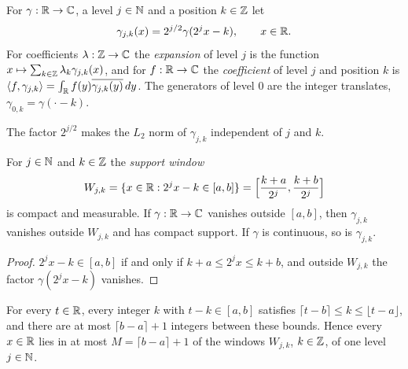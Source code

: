 \begin{definition}
\label{def:daub-generators}
\leanok
For $\gamma : \mathbb{R} \to \mathbb{C}$, a level $j \in \mathbb{N}$ and a position $k \in \mathbb{Z}$ let
\[
  \gamma_{j,k}(x) = 2^{j/2} \gamma(2^j x - k) , \qquad x \in \mathbb{R} .
\]
For coefficients $\lambda : \mathbb{Z} \to \mathbb{C}$ the \emph{expansion} of level $j$ is the function
$x \mapsto \sum_{k \in \mathbb{Z}} \lambda_k \gamma_{j,k}(x)$, and for $f : \mathbb{R} \to \mathbb{C}$ the
\emph{coefficient} of level $j$ and position $k$ is
$\langle f, \gamma_{j,k} \rangle = \int_{\mathbb{R}} f(y) \overline{\gamma_{j,k}(y)} \, dy$.
The generators of level $0$ are the integer translates, $\gamma_{0,k} = \gamma(\cdot - k)$.
\end{definition}

The factor $2^{j/2}$ makes the $L_2$ norm of $\gamma_{j,k}$ independent of $j$ and $k$.

\begin{lemma}
\label{lem:daub-support-window}
\leanok
{}
For $j \in \mathbb{N}$ and $k \in \mathbb{Z}$ the \emph{support window}
\[
  W_{j,k} = \{x \in \mathbb{R} : 2^j x - k \in [a, b]\}
  = \Bigl[\frac{k + a}{2^j}, \frac{k + b}{2^j}\Bigr]
\]
is compact and measurable. If $\gamma : \mathbb{R} \to \mathbb{C}$ vanishes outside $[a, b]$, then $\gamma_{j,k}$
vanishes outside $W_{j,k}$ and has compact support. If $\gamma$ is continuous, so is
$\gamma_{j,k}$.
\end{lemma}

\begin{proof}
\leanok
$2^j x - k \in [a, b]$ if and only if $k + a \leq 2^j x \leq k + b$, and outside $W_{j,k}$ the
factor $\gamma(2^j x - k)$ vanishes.
\end{proof}

\begin{lemma}
\label{lem:daub-window-overlap}
\leanok
{}
For every $t \in \mathbb{R}$, every integer $k$ with $t - k \in [a, b]$ satisfies
$\lceil t - b \rceil \leq k \leq \lfloor t - a \rfloor$, and there are at most
$\lceil b - a \rceil + 1$ integers between these bounds. Hence every $x \in \mathbb{R}$ lies in at most
$M = \lceil b - a \rceil + 1$ of the windows $W_{j,k}$, $k \in \mathbb{Z}$, of one level $j \in \mathbb{N}$.
\end{lemma}

